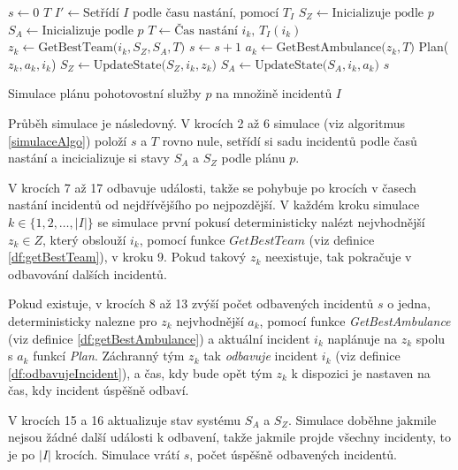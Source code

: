 \begin{algorithm}[H]
  \begin{algorithmic}[1]
    \State $s \gets 0$
    \State $T$ 
    \State $I' \gets \mbox{Setřídí $I$ podle času nastání, pomocí $T_I$}$
    \State $S_Z \gets \mbox{Inicializuje podle $p$}$
    \State $S_A \gets \mbox{Inicializuje podle $p$}$
      \State $T \gets \mbox{Čas nastání $i_k$, $T_I(i_k)$}$
      \State $z_k \gets \mbox{GetBestTeam($i_k, S_Z, S_A, T$)}$
        \State $s \gets s + 1$
        \State $a_k \gets \mbox{GetBestAmbulance($z_k, T$)}$
        \State Plan($z_k, a_k, i_k$)
      \EndIf
      \State $S_Z \gets \mbox{UpdateState($S_Z, i_k, z_k$)}$
      \State $S_A \gets \mbox{UpdateState($S_A, i_k, a_k$)}$
    \EndFor
    \State \Return $s$
  \EndFunction
  \end{algorithmic}
  \caption{Simulace plánu pohotovostní služby $p$ na množině incidentů $I$}
  \label{simulaceAlgo}
\end{algorithm}

\vspace*{10px}

Průběh simulace je následovný. 
V krocích 2 až 6 simulace (viz algoritmus \ref{simulaceAlgo}) položí $s$ a $T$ rovno nule, setřídí si sadu incidentů podle časů nastání
a incicializuje si stavy $S_A$ a $S_Z$ podle plánu $p$.

V krocích 7 až 17 odbavuje události, takže se pohybuje po krocích v časech nastání incidentů od nejdřívějšího po nejpozdější.
V každém kroku simulace $k \in \{ 1, 2, \dots , |I|\}$ se simulace první pokusí deterministicky nalézt nejvhodnější $z_k \in Z$, který obslouží $i_k$,
pomocí funkce $\textit{GetBestTeam}$ (viz definice \ref{df:getBestTeam}), v kroku 9. 
Pokud takový $z_k$ neexistuje, tak pokračuje v odbavování dalších incidentů.

Pokud existuje, v krocích 8 až 13 zvýší počet odbavených incidentů $s$ o jedna,
deterministicky nalezne pro $z_k$ nejvhodnější $a_k$, pomocí funkce \textit{GetBestAmbulance} (viz definice \ref{df:getBestAmbulance}) a
aktuální incident $i_k$ naplánuje na $z_k$ spolu s $a_k$ funkcí \textit{Plan}.
Záchranný tým $z_k$ tak \textit{odbavuje} incident $i_k$ (viz definice \ref{df:odbavujeIncident}), a čas, kdy bude opět tým $z_k$ k dispozici je nastaven na čas, kdy incident úspěšně odbaví. 

V krocích 15 a 16 aktualizuje stav systému $S_A$ a $S_Z$.
Simulace doběhne jakmile nejsou žádné další události k odbavení, takže jakmile projde všechny incidenty, to je po $|I|$ krocích.
Simulace vrátí $s$, počet úspěšně odbavených incidentů.

